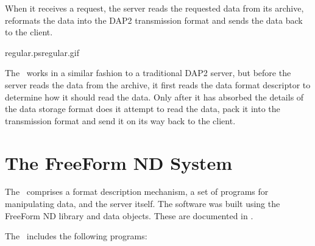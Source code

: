 When it receives a request, the server reads the requested data from
its archive, reformats the data into the DAP2 transmission format and
sends the data back to the client.

{regular.ps}{regular.gif}{}

The \ffs\ works in a similar fashion to a traditional DAP2 server, but
before the server reads the data from the archive, it first reads the
data format descriptor to determine how it should read the data.  Only
after it has absorbed the details of the data storage format does it
attempt to read the data, pack it into the transmission format and
send it on its way back to the client.


\section{The FreeForm ND System}

The \ffs\ comprises a format description mechanism, a set of programs
for manipulating data, and the server itself.  The software was built
using the FreeForm ND library and data objects.  These are documented
in \ffbook .

The \ffs\ includes the following programs:

